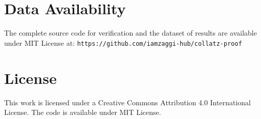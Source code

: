 ﻿\documentclass[11pt]{amsart}
\begin{document}
\section*{Data Availability}
The complete source code for verification and the dataset of results are available under MIT License at: \texttt{https://github.com/iamzaggi-hub/collatz-proof}

\section*{License}
This work is licensed under a Creative Commons Attribution 4.0 International License. The code is available under MIT License.
\end{document}
